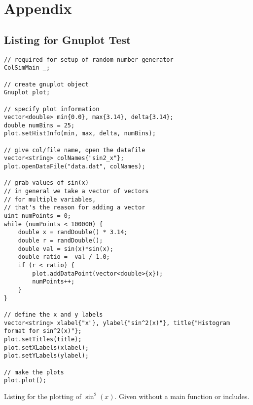 \section{Appendix}

\subsection{Listing for Gnuplot Test}\label{sec:gnuplot-listing}

\begin{listing}[ht]
\begin{verbatim}
// required for setup of random number generator
ColSimMain _;

// create gnuplot object
Gnuplot plot;

// specify plot information
vector<double> min{0.0}, max{3.14}, delta{3.14};
double numBins = 25;
plot.setHistInfo(min, max, delta, numBins);

// give col/file name, open the datafile
vector<string> colNames{"sin2_x"};
plot.openDataFile("data.dat", colNames);

// grab values of sin(x)
// in general we take a vector of vectors
// for multiple variables,
// that's the reason for adding a vector
uint numPoints = 0;
while (numPoints < 100000) {
	double x = randDouble() * 3.14;
	double r = randDouble();
	double val = sin(x)*sin(x);
	double ratio =  val / 1.0;
	if (r < ratio) {
	    plot.addDataPoint(vector<double>{x});
		numPoints++;
	}
}
	
// define the x and y labels
vector<string> xlabel{"x"}, ylabel{"sin^2(x)"}, title{"Histogram format for sin^2(x)"};
plot.setTitles(title);
plot.setXLabels(xlabel);
plot.setYLabels(ylabel);

// make the plots
plot.plot();
\end{verbatim}
\caption{Listing for the plotting of $\sin^2(x)$. Given without a main function or includes.}
\label{listing:gnuplot-testing}
\end{listing}




